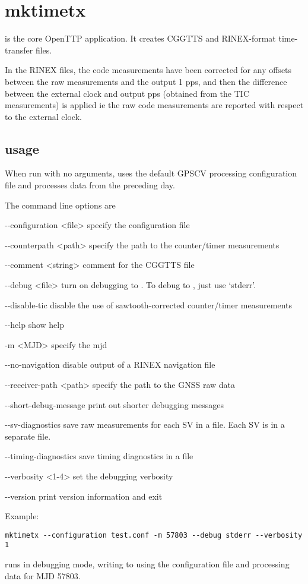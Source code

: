 
\section{mktimetx}

\hypertarget{h:mktimetx}{}

 is the core OpenTTP application.
It creates CGGTTS and RINEX-format time-transfer files.

In the RINEX files, the code measurements have been corrected for any offsets between the raw measurements
and the output 1 pps, and then the difference between the external clock and output pps (obtained from the TIC measurements)
is applied ie the raw code measurements are reported with respect to the external clock.

\subsection{usage}

When run with no arguments,  uses the default GPSCV processing configuration file 
 and processes data from the preceding day.

The command line options are
\begin{description*}
	\item[-{}-configuration \textless file\textgreater] specify the configuration file
	\item[-{}-counterpath \textless path\textgreater]	specify the path to the counter/timer measurements
	\item[-{}-comment \textless string\textgreater] comment for the CGGTTS file	
	\item[-{}-debug \textless file\textgreater]	turn on debugging to . To debug to , just use `stderr'.
	\item[-{}-disable-tic] disable the use of sawtooth-corrected counter/timer measurements 
	\item[-{}-help] show help
	\item[-m \textless MJD\textgreater] specify the mjd
	\item[-{}-no-navigation] disable output of a RINEX navigation file
	\item[-{}-receiver-path \textless path\textgreater] specify the path to the GNSS raw data
	\item[-{}-short-debug-message] print out shorter debugging messages
	\item[-{}-sv-diagnostics] save raw measurements for each SV in a file. Each SV is in a separate file.
	\item[-{}-timing-diagnostics] save timing diagnostics in a file
	\item[-{}-verbosity \textless 1-4\textgreater] set the debugging verbosity
	\item[-{}-version] print version information	and exit
\end{description*}
Example:
\begin{lstlisting}
mktimetx --configuration test.conf -m 57803 --debug stderr --verbosity 1 
\end{lstlisting}
runs  in debugging mode, writing to  using the configuration file  and processing
data for MJD 57803.

